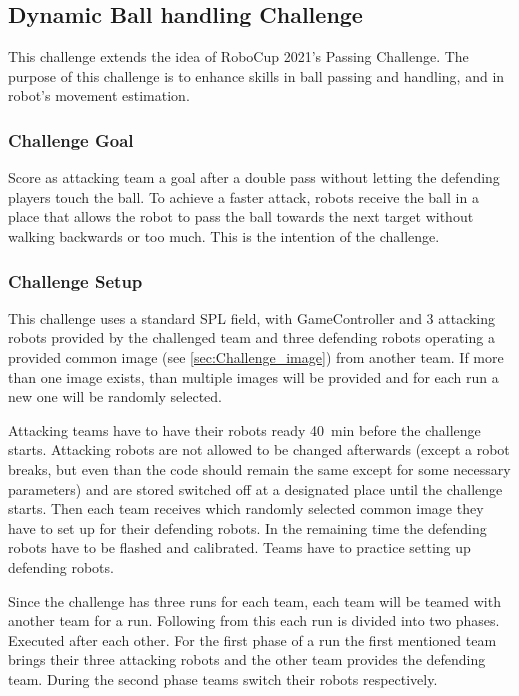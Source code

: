\clearpage
\newpage

\subsection{Dynamic Ball handling Challenge}

    This challenge extends the idea of RoboCup 2021's Passing Challenge. The purpose of this challenge is to enhance skills in ball passing and handling, and in robot's movement estimation.

    \subsubsection{Challenge Goal}

        Score as attacking team a goal after a double pass without letting the defending players touch the ball. To achieve a faster attack, robots receive the ball in a place that allows the robot to pass the ball towards the next target without walking backwards or too much. This is the intention of the challenge. 

    \subsubsection{Challenge Setup}

        This challenge uses a standard SPL field, with GameController and 3 attacking robots provided by the challenged team and three defending robots operating a provided common image (see \cref{sec:Challenge_image}) from another team. If more than one image exists, than multiple images will be provided and for each run a new one will be randomly selected.

        Attacking teams have to have their robots ready \qty{40}{\minute} before the challenge starts. Attacking robots are not allowed to be changed afterwards (except a robot breaks, but even than the code should remain the same except for some necessary parameters) and are stored switched off at a designated place until the challenge starts. Then each team receives  which randomly selected common image they have to set up for their defending robots. In the remaining time the defending robots have to be flashed and calibrated. Teams have to practice setting up defending robots.

        Since the challenge has three runs for each team, each team will be teamed with another team for a run. Following from this each run is divided into two phases. Executed after each other. For the first phase of a run the first mentioned team brings their three attacking robots and the other team provides the defending team. During the second phase teams switch their robots respectively.

